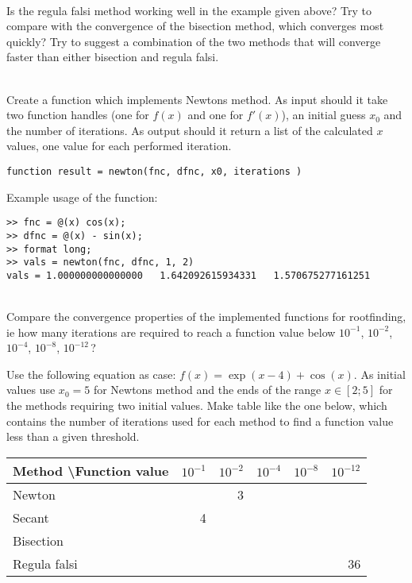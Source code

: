 \begin{ex}\\
Is the regula falsi method working well in the example given above? 
Try to compare with the convergence of the bisection method, which converges 
most quickly?
Try to suggest a combination of the two methods that will converge faster than 
either bisection and regula falsi.
\end{ex}



\begin{ex}\\
Create a function which implements Newtons method. 
As input should it take two function handles (one for $f(x)$ and one for $f'(x)$), 
an initial guess $x_0$ and the number of iterations.
As output should it return a list of the calculated $x$ values, one value for each performed iteration.
\begin{lstlisting}
function result = newton(fnc, dfnc, x0, iterations )
\end{lstlisting}
Example usage of the function:
\begin{lstlisting}
>> fnc = @(x) cos(x);
>> dfnc = @(x) - sin(x);
>> format long;
>> vals = newton(fnc, dfnc, 1, 2)
vals = 1.000000000000000   1.642092615934331   1.570675277161251
\end{lstlisting}
\end{ex}




\begin{ex}\\
Compare the convergence properties of the implemented functions for rootfinding, 
ie how many iterations are required to reach a function value below $10^{-1}$,
$10^{-2}$, $10^{-4}$, $10^{-8}$, $10^{-12}$\,?

Use the following equation as case: $f(x) = \exp(x - 4) + \cos(x)$.
As initial values use $x_0 = 5$ for Newtons method and the ends of the range 
$x \in [2; 5]$ for the methods requiring two initial values.
Make table like the one below, which contains the number of iterations used for 
each method to find a function value less than a given threshold.

\begin{centering}
\begin{tabular}{l|r|r|r|r|r}
Method \textbackslash Function value	& $10^{-1}$ & $10^{-2}$ & $10^{-4}$ & $10^{-8}$ & $10^{-12}$ \\
\hline
Newton	&  	& 3 	&  	&  	&	\\
Secant	& 4	&	& 	& 	&	\\
Bisection	&	&	&	&	&	\\
Regula falsi &	&	&	& 	& 36	\\
\end{tabular}
\end{centering}
\end{ex}
 